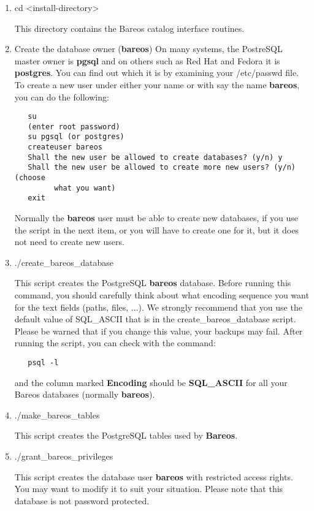 \begin{enumerate}
\item cd {\textless}install-directory{\textgreater}

   This directory contains the Bareos catalog interface routines.

\item Create the database owner ({\bf bareos})
   On many systems, the PostreSQL master
   owner is {\bf pgsql} and on others such as Red Hat and Fedora it is {\bf
   postgres}.  You can find out which it is by examining your /etc/passwd
   file.  To create a new user under either your name or with say the name
   {\bf bareos}, you can do the following:

\begin{verbatim}
   su
   (enter root password)
   su pgsql (or postgres)
   createuser bareos
   Shall the new user be allowed to create databases? (y/n) y
   Shall the new user be allowed to create more new users? (y/n) (choose
         what you want)
   exit
\end{verbatim}
   Normally the {\bf bareos} user must be able to create new databases,
   if you use the script in the next item,
   or you will have to create one for it, but it does not need to
   create new users.

\item ./create\_bareos\_database

   This script creates the PostgreSQL {\bf bareos} database.
   Before running this command, you should carefully think about
   what encoding sequence you want for the text fields (paths, files, ...).
   We strongly recommend that you use the default value of SQL\_ASCII
   that is in the create\_bareos\_database script.  Please be warned
   that if you change this value, your backups may fail.  After running
   the script, you can check with the command:

\begin{verbatim}
   psql -l
\end{verbatim}

   and the column marked {\bf Encoding} should be {\bf SQL\_ASCII} for
   all your Bareos databases (normally {\bf bareos}).

\item ./make\_bareos\_tables

   This script creates the PostgreSQL tables used by {\bf Bareos}.
\item ./grant\_bareos\_privileges

   This script creates the database user {\bf bareos}  with restricted access
rights. You may  want to modify it to suit your situation. Please note that
this database is not password protected.

\end{enumerate}

